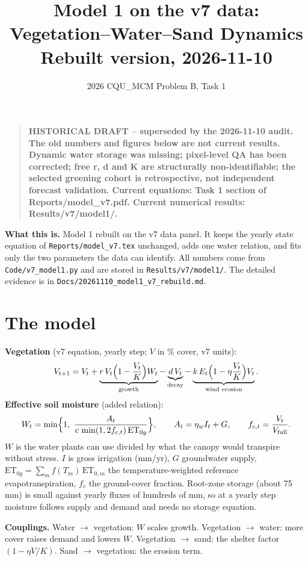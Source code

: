 \documentclass[11pt,a4paper]{article}
\title{Model 1 on the v7 data: Vegetation--Water--Sand Dynamics\\[2pt]\large Rebuilt version, 2026-11-10}
\author{2026 CQU\_MCM Problem B, Task 1}
\date{}
\begin{document}
\maketitle
\begin{quote}\small\bfseries
HISTORICAL DRAFT -- superseded by the 2026-11-10 audit. The old numbers and figures
below are not current results. Dynamic water storage was missing; pixel-level QA
has been corrected; free r, d and K are structurally non-identifiable; the selected
greening cohort is retrospective, not independent forecast validation.
Current equations: Task 1 section of Reports/model\_v7.pdf.
Current numerical results: Results/v7/model1/.
\end{quote}


\noindent\textbf{What this is.} Model 1 rebuilt on the v7 data panel. It keeps the yearly state equation of \texttt{Reports/model\_v7.tex} unchanged, adds one water relation, and fits only the two parameters the data can identify. All numbers come from \texttt{Code/v7\_model1.py} and are stored in \texttt{Results/v7/model1/}. The detailed evidence is in \texttt{Docs/20261110\_model1\_v7\_rebuild.md}.

\section{The model}
\textbf{Vegetation} (v7 equation, yearly step; $V$ in \% cover, v7 units):
\begin{equation}
V_{t+1}=V_t+\underbrace{r\,V_t\Bigl(1-\frac{V_t}{K}\Bigr)W_t}_{\text{growth}}-\underbrace{d\,V_t}_{\text{decay}}-\underbrace{k\,E_t\Bigl(1-\eta\frac{V_t}{K}\Bigr)V_t}_{\text{wind erosion}} .
\end{equation}
\textbf{Effective soil moisture} (added relation):
\begin{equation}
W_t=\min\Bigl\{1,\ \frac{A_t}{c\,\min(1,2f_{c,t})\,\mathrm{ET}_{0g}}\Bigr\},\qquad
A_t=\eta_w I_t+G,\qquad f_{c,t}=\frac{V_t}{V_{\mathrm{full}}} .
\end{equation}
$W$ is the water plants can use divided by what the canopy would transpire without stress. $I$ is gross irrigation (mm/yr), $G$ groundwater supply, $\mathrm{ET}_{0g}=\sum_m f(T_m)\,\mathrm{ET}_{0,m}$ the temperature-weighted reference evapotranspiration, $f_c$ the ground-cover fraction. Root-zone storage (about 75 mm) is small against yearly fluxes of hundreds of mm, so at a yearly step moisture follows supply and demand and needs no storage equation.

\textbf{Couplings.} Water $\to$ vegetation: $W$ scales growth. Vegetation $\to$ water: more cover raises demand and lowers $W$. Vegetation $\to$ sand: the shelter factor $(1-\eta V/K)$. Sand $\to$ vegetation: the erosion term.
\end{document}
